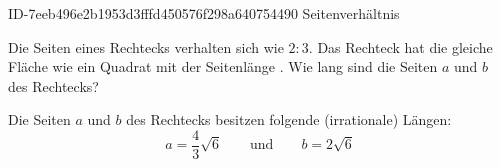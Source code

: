 \begin{exercise}
      {ID-7eeb496e2b1953d3fffd450576f298a640754490}
      {Seitenverhältnis}
  \ifproblem\problem\par
    Die Seiten eines Rechtecks verhalten sich wie $2:3$. Das Rechteck hat
    die gleiche Fläche wie ein Quadrat mit der Seitenlänge .
    Wie lang sind die Seiten $a$ und $b$ des Rechtecks?
  \fi
  \ifoutcome\outcome\par
    Die Seiten $a$ und $b$ des Rechtecks besitzen folgende (irrationale) Längen:
    \begin{equation*}
      a=\frac{4}{3}\sqrt{6}
      \qquad\text{und}\qquad
      b=2\sqrt{6}
    \end{equation*}
  \fi
\end{exercise}
